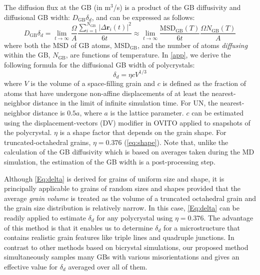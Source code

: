 \documentclass[preprint,12pt,sort&compress]{elsarticle} %
\newcommand{\?}{\stackrel{?}{=}}
\providecommand{\DIFaddtex}[1]{{\sf #1}} %
\providecommand{\DIFaddbegin}{\protect\color{blue}} %
\providecommand{\DIFaddend}{\protect\color{black}} %
\providecommand{\DIFadd}[1]{\texorpdfstring{\DIFaddtex{#1}}{#1}} %
\newcommand{\DIFaddincludegraphics}[2][]{{\color{blue}\fbox{\DIFOincludegraphics[#1]{#2}}}} %
\DeclareRobustCommand{\DIFaddbegin}{\DIFOaddbegin \let\includegraphics\DIFaddincludegraphics} %
\DeclareRobustCommand{\DIFaddend}{\DIFOaddend \let\includegraphics\DIFOincludegraphics} %
\begin{document}
The diffusion flux at the GB (in m$^3$/s) is a product of the GB diffusivity and diffusional GB width: $D_{\mathrm{GB}} \delta_d$, and can be expressed as follows:
\begin{equation}
D_{\mathrm{GB}} \delta_d = \lim_{t \rightarrow \infty} \frac{\Omega}{A} \frac{\sum_{i=1}^{N_{\mathrm{GB}}} |\Delta \mathbf{r}_i(t)|^2}{6t} \approx \lim_{t \rightarrow \infty} \frac{\mathrm{MSD}_{\mathrm{GB}}(T)}{6t} \frac{\Omega N_{\mathrm{GB}}(T) }{A}
\label{Eq:GBDiffFlux}
\end{equation}
where both the MSD of GB atoms, MSD${_{\text{GB}}}$, and the number of atoms \textit{diffusing} within the GB, $N_{\mathrm{GB}}$, are functions of temperature. In \ref{app}, we derive the following formula for the diffusional GB width of polycrystals:
\begin{equation}
\delta_d = \eta c V^{1/3}
\label{Eq:delta}
\end{equation}
where $V$ is the volume of a space-filling grain and $c$ is defined as the fraction of atoms that have undergone non-affine displacements of at least the nearest-neighbor distance in the limit of infinite simulation time. For UN, the nearest-neighbor distance is $0.5a$, where $a$ is the lattice parameter. $c$ can be estimated using the displacement-vectors (DV) modifier in OVITO \cite{Stukowski2010} applied to snapshots of the polycrystal. $\eta$ is a shape factor that depends on the grain shape. For truncated-octahedral grains, $\eta = 0.376$ \DIFaddbegin \DIFadd{(\cref{eq:shape})}\DIFaddend . Note that, unlike the calculation of the GB diffusivity which is based on averages taken during the MD simulation, the estimation of the GB width is a post-processing step.

Although \cref{Eq:delta} is derived for grains of uniform size and shape, it is principally applicable to grains of random sizes and shapes provided that the average \textit{grain volume} is treated as the volume of a truncated octahedral grain and the grain size distribution is relatively narrow. In this case, \cref{Eq:delta} can be readily applied to estimate $\delta_d$ for any polycrystal using $\eta = 0.376$. The advantage of this method is that it enables us to determine $\delta_d$ for a microstructure that contains realistic grain features like triple lines and quadruple junctions. In contrast to other methods based on bicrystal simulations, our proposed method simultaneously samples many GBs with various misorientations and gives an effective value for $\delta_d$ averaged over all of them.
\end{document}
